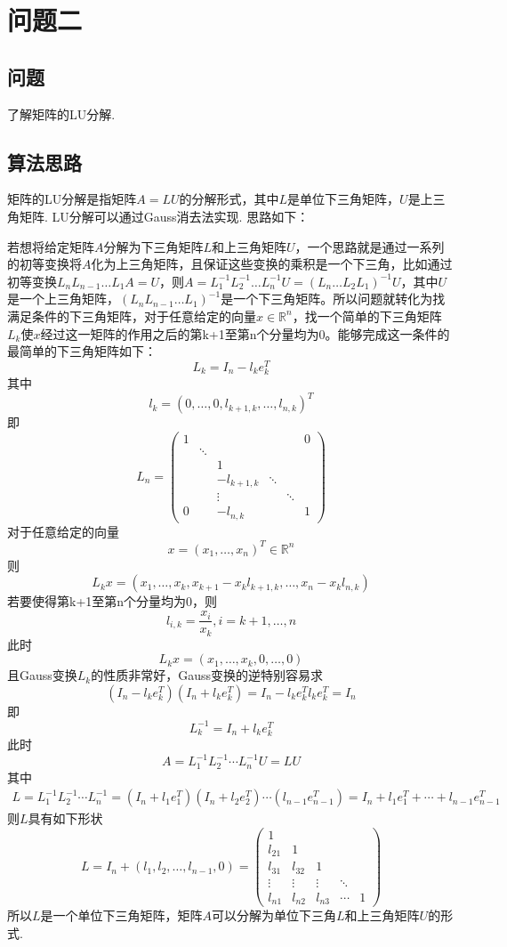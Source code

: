 \documentclass[UTF8,ctexart,a4paper,11pt,openany]{article}
\theoremstyle{definition}
\begin{document}
\section{问题二} 
    \subsection{问题}
    了解矩阵的LU分解.
    \subsection{算法思路}
    矩阵的LU分解是指矩阵$A=LU$的分解形式，其中$L$是单位下三角矩阵，$U$是上三角矩阵. LU分解可以通过Gauss消去法实现. 思路如下：\par
    若想将给定矩阵$A$分解为下三角矩阵$L$和上三角矩阵$U$，一个思路就是通过一系列的初等变换将$A$化为上三角矩阵，且保证这些变换的乘积是一个下三角，比如通过初等变换$L_{n}L_{n-1}\dots L_1A=U$，则$A=L_1^{-1}L_2^{-1}\dots L_{n}^{-1}U=(L_{n}\dots L_2L_1)^{-1}U$，其中$U$是一个上三角矩阵，$(L_{n}L_{n-1}\dots L_1)^{-1}$是一个下三角矩阵。所以问题就转化为找满足条件的下三角矩阵，对于任意给定的向量$x\in \mathbb{R}^n$，找一个简单的下三角矩阵$L_k$使$x$经过这一矩阵的作用之后的第k+1至第n个分量均为0。能够完成这一条件的最简单的下三角矩阵如下：$$L_k=I_n-l_ke_k^T$$其中$$l_k=(0,\dots,0,l_{k+1, k},\dots,l_{n,k})^T$$即
    $$L_{n}=\left(\begin{array}{cccccc}1 & & & & & 0 \\ & \ddots & & & & \\ & & 1 & & & \\ & & -l_{k+1, k} & \ddots & & \\ & & \vdots & & \ddots & \\ 0 & & -l_{n, k} & & & 1\end{array}\right)$$
    \indent 对于任意给定的向量$$x=(x_1,\dots,x_n)^T\in \mathbb{R}^n$$则$$L_kx=(x_1,\dots,x_k,x_{k+1}-x_kl_{k+1,k},\dots,x_n-x_kl_{n,k})$$若要使得第k+1至第n个分量均为0，则$$l_{i,k}=\frac{x_i}{x_k},i=k+1,\dots,n$$此时$$L_kx=(x_1,\dots,x_k,0,\dots,0)$$且Gauss变换$L_k$的性质非常好，Gauss变换的逆特别容易求$$(I_n-l_ke_k^T)(I_n+l_ke_k^T)=I_n-l_ke_k^Tl_ke_k^T=I_n$$即$$L_k^{-1}=I_n+l_ke_k^T$$此时$$A=L_{1}^{-1} L_{2}^{-1} \cdots L_{n}^{-1} U=L U$$其中$$\begin{array}{c}L=L_{1}^{-1} L_{2}^{-1} \cdots L_{n}^{-1}=\left(I_n+l_{1} e_{1}^{T}\right)\left(I_n+l_{2} e_{2}^{T}\right) \cdots\left(l_{n-1} e_{n-1}^{T}\right)=I_n+l_{1} e_{1}^{T}+\cdots  +l_{n-1} e_{n-1}^{T}\end{array}$$则$L$具有如下形状$$L=I_n+\left(l_{1}, l_{2}, \ldots, l_{n-1}, 0\right)=\left(\begin{array}{ccccc}1 & & & & \\ l_{21} & 1 & & & \\ l_{31} & l_{32} & 1 & & \\ \vdots & \vdots & \vdots & \ddots & \\ l_{n 1} & l_{n 2} & l_{n 3} & \cdots & 1\end{array}\right)$$所以$L$是一个单位下三角矩阵，矩阵$A$可以分解为单位下三角$L$和上三角矩阵$U$的形式.
\end{document}

